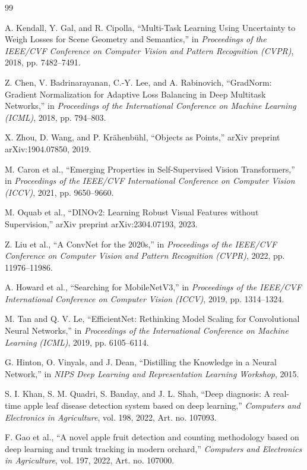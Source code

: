 \documentclass[preprint,12pt]{elsarticle}
\begin{document}
\begin{thebibliography}{99}

A. Kendall, Y. Gal, and R. Cipolla,
``Multi-Task Learning Using Uncertainty to Weigh Losses for Scene
Geometry and Semantics,''
in \textit{Proceedings of the IEEE/CVF Conference on Computer Vision
and Pattern Recognition (CVPR)}, 2018, pp. 7482--7491.

Z. Chen, V. Badrinarayanan, C.-Y. Lee, and A. Rabinovich,
``GradNorm: Gradient Normalization for Adaptive Loss Balancing in
Deep Multitask Networks,''
in \textit{Proceedings of the International Conference on Machine
Learning (ICML)}, 2018, pp. 794--803.

X. Zhou, D. Wang, and P. Kr{\"a}henb{\"u}hl,
``Objects as Points,''
arXiv preprint arXiv:1904.07850, 2019.

M. Caron et al.,
``Emerging Properties in Self-Supervised Vision Transformers,''
in \textit{Proceedings of the IEEE/CVF International Conference on
Computer Vision (ICCV)}, 2021, pp. 9650--9660.

M. Oquab et al.,
``DINOv2: Learning Robust Visual Features without Supervision,''
arXiv preprint arXiv:2304.07193, 2023.

Z. Liu et al.,
``A ConvNet for the 2020s,''
in \textit{Proceedings of the IEEE/CVF Conference on Computer Vision
and Pattern Recognition (CVPR)}, 2022, pp. 11976--11986.

A. Howard et al.,
``Searching for MobileNetV3,''
in \textit{Proceedings of the IEEE/CVF International Conference on
Computer Vision (ICCV)}, 2019, pp. 1314--1324.

M. Tan and Q. V. Le,
``EfficientNet: Rethinking Model Scaling for Convolutional Neural
Networks,''
in \textit{Proceedings of the International Conference on Machine
Learning (ICML)}, 2019, pp. 6105--6114.

G. Hinton, O. Vinyals, and J. Dean,
``Distilling the Knowledge in a Neural Network,''
in \textit{NIPS Deep Learning and Representation Learning Workshop},
2015.

S. I. Khan, S. M. Quadri, S. Banday, and J. L. Shah,
``Deep diagnosis: A real-time apple leaf disease detection system
based on deep learning,''
\textit{Computers and Electronics in Agriculture},
vol. 198, 2022, Art. no. 107093.

F. Gao et al.,
``A novel apple fruit detection and counting methodology based on
deep learning and trunk tracking in modern orchard,''
\textit{Computers and Electronics in Agriculture},
vol. 197, 2022, Art. no. 107000.


\end{thebibliography}
\end{document}
